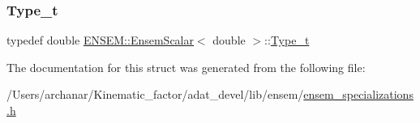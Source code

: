 \subsubsection{\texorpdfstring{Type\_t}{Type\_t}\hspace{0.1cm}{\footnotesize\ttfamily [2/2]}}
{\footnotesize\ttfamily typedef double \mbox{\hyperlink{structENSEM_1_1EnsemScalar}{E\+N\+S\+E\+M\+::\+Ensem\+Scalar}}$<$ double $>$\+::\mbox{\hyperlink{structENSEM_1_1EnsemScalar_3_01double_01_4_a4f1860ca5dda43a72f79631b986d414e}{Type\+\_\+t}}}



The documentation for this struct was generated from the following file\+:\begin{DoxyCompactItemize}
\item 
/\+Users/archanar/\+Kinematic\+\_\+factor/adat\+\_\+devel/lib/ensem/\mbox{\hyperlink{lib_2ensem_2ensem__specializations_8h}{ensem\+\_\+specializations.\+h}}\end{DoxyCompactItemize}

